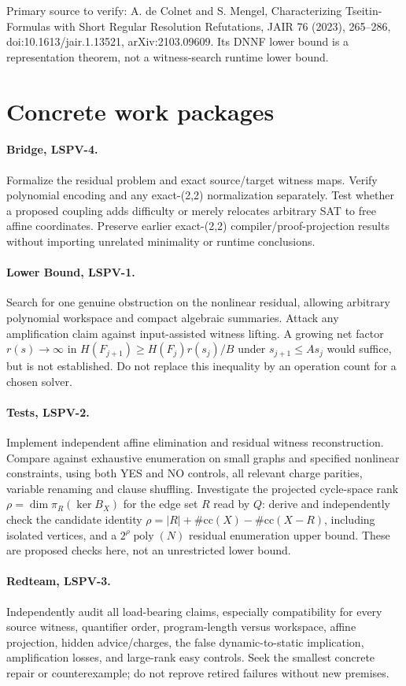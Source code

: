 \documentclass[11pt]{article}
\begin{document}
Primary source to verify: A. de Colnet and S. Mengel, Characterizing Tseitin-Formulas with Short Regular Resolution Refutations, JAIR 76 (2023), 265--286, doi:10.1613/jair.1.13521, arXiv:2103.09609. Its DNNF lower bound is a representation theorem, not a witness-search runtime lower bound.
\section*{Concrete work packages}
\paragraph{Bridge, LSPV-4.} Formalize the residual problem and exact source/target witness maps. Verify polynomial encoding and any exact-(2,2) normalization separately. Test whether a proposed coupling adds difficulty or merely relocates arbitrary SAT to free affine coordinates. Preserve earlier exact-(2,2) compiler/proof-projection results without importing unrelated minimality or runtime conclusions.
\paragraph{Lower Bound, LSPV-1.} Search for one genuine obstruction on the nonlinear residual, allowing arbitrary polynomial workspace and compact algebraic summaries. Attack any amplification claim against input-assisted witness lifting. A growing net factor $r(s)\to\infty$ in $H(F_{j+1})\ge H(F_j)r(s_j)/B$ under $s_{j+1}\le As_j$ would suffice, but is not established. Do not replace this inequality by an operation count for a chosen solver.
\paragraph{Tests, LSPV-2.} Implement independent affine elimination and residual witness reconstruction. Compare against exhaustive enumeration on small graphs and specified nonlinear constraints, using both YES and NO controls, all relevant charge parities, variable renaming and clause shuffling. Investigate the projected cycle-space rank $\rho=\dim\pi_R(\ker B_X)$ for the edge set $R$ read by $Q$: derive and independently check the candidate identity $\rho=|R|+\#\mathrm{cc}(X)-\#\mathrm{cc}(X-R)$, including isolated vertices, and a $2^\rho\operatorname{poly}(N)$ residual enumeration upper bound. These are proposed checks here, not an unrestricted lower bound.
\paragraph{Redteam, LSPV-3.} Independently audit all load-bearing claims, especially compatibility for every source witness, quantifier order, program-length versus workspace, affine projection, hidden advice/charges, the false dynamic-to-static implication, amplification losses, and large-rank easy controls. Seek the smallest concrete repair or counterexample; do not reprove retired failures without new premises.
\end{document}
